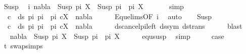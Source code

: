 \begin{isabellebody}
\ Susp\ \isamarkupfalse%
\ i{\isacharcolon}{\kern0pt}\ {\isachardoublequoteopen}nabla\ {\isasymturnstile}\ Susp\ pi\ X\ {\isasymapprox}\ Susp\ {\isacharparenleft}{\kern0pt}pi{}\ {\isacharat}{\kern0pt}\ pi{\isacharprime}{\kern0pt}{\isacharparenright}{\kern0pt}\ X{\isachardoublequoteclose}\ \isanewline
\ \ \ \ \isamarkupfalse%
\ simp\isanewline
\ \ \isamarkupfalse%
\ \isamarkupfalse%
\ {\isachardoublequoteopen}{\isasymforall}\ c\ {\isasymin}\ ds\ pi\ {\isacharparenleft}{\kern0pt}pi{}\ {\isacharat}{\kern0pt}\ pi{\isacharprime}{\kern0pt}{\isacharparenright}{\kern0pt}{\isachardot}{\kern0pt}\ {\isacharparenleft}{\kern0pt}c{\isacharcomma}{\kern0pt}X{\isacharparenright}{\kern0pt}\ {\isasymin}\ nabla{\isachardoublequoteclose}\isanewline
\ \ \ \ \isamarkupfalse%
\ Equ{\isacharunderscore}{\kern0pt}elims{\isacharparenleft}{\kern0pt}{}{\isacharparenright}{\kern0pt}{\isacharbrackleft}{\kern0pt}OF\ i{\isacharbrackright}{\kern0pt}\ \isamarkupfalse%
\ auto\isanewline
\ \ \isamarkupfalse%
\ Susp\ \isamarkupfalse%
\ {\isachardoublequoteopen}{\isasymforall}\ c\ {\isasymin}\ ds\ pi\ {\isacharparenleft}{\kern0pt}pi{}\ {\isacharat}{\kern0pt}\ pi{\isacharprime}{\kern0pt}{\isacharparenright}{\kern0pt}{\isachardot}{\kern0pt}\ {\isacharparenleft}{\kern0pt}c{\isacharcomma}{\kern0pt}X{\isacharparenright}{\kern0pt}\ {\isasymin}\ nabla{\isachardoublequoteclose}\isanewline
\ \ \ \ \isamarkupfalse%
\ ds{\isacharunderscore}{\kern0pt}cancel{\isacharunderscore}{\kern0pt}pi{\isacharunderscore}{\kern0pt}left\ ds{\isacharunderscore}{\kern0pt}sym\ ds{\isacharunderscore}{\kern0pt}trans\isanewline
\ \ \ \ \isamarkupfalse%
\ blast\isanewline
\ \ \isamarkupfalse%
\ \isamarkupfalse%
\ {\isachardoublequoteopen}nabla\ {\isasymturnstile}\ Susp\ pi\ X\ {\isasymapprox}\ Susp\ {\isacharparenleft}{\kern0pt}pi{}\ {\isacharat}{\kern0pt}\ pi{\isacharprime}{\kern0pt}{\isacharparenright}{\kern0pt}\ X{\isachardoublequoteclose}\isanewline
\ \ \ \ \isamarkupfalse%
\ equ{\isacharunderscore}{\kern0pt}susp\ \isamarkupfalse%
\ simp\isanewline
\ \ \isamarkupfalse%
\ \isamarkupfalse%
\ {\isacharquery}{\kern0pt}case\ \isamarkupfalse%
\ t{}\ swap{\isachardot}{\kern0pt}simps{\isacharparenleft}{\kern0pt}{}{\isacharparenright}{\kern0pt}\ \isamarkupfalse%

\end{isabellebody}
